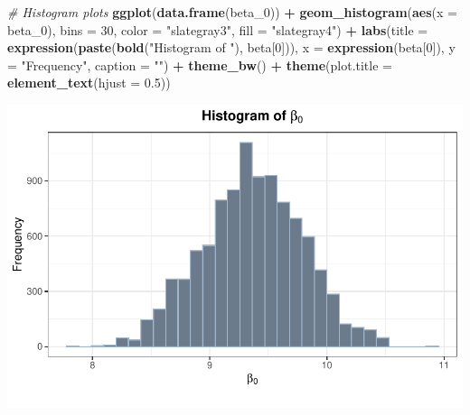 \documentclass[
]{article}
\newenvironment{Shaded}{\begin{snugshade}}{\end{snugshade}}
\newcommand{\AttributeTok}[1]{\textcolor[rgb]{0.13,0.29,0.53}{#1}}
\newcommand{\CommentTok}[1]{\textcolor[rgb]{0.56,0.35,0.01}{\textit{#1}}}
\newcommand{\DecValTok}[1]{\textcolor[rgb]{0.00,0.00,0.81}{#1}}
\newcommand{\FloatTok}[1]{\textcolor[rgb]{0.00,0.00,0.81}{#1}}
\newcommand{\FunctionTok}[1]{\textcolor[rgb]{0.13,0.29,0.53}{\textbf{#1}}}
\newcommand{\NormalTok}[1]{#1}
\newcommand{\SpecialCharTok}[1]{\textcolor[rgb]{0.81,0.36,0.00}{\textbf{#1}}}
\newcommand{\StringTok}[1]{\textcolor[rgb]{0.31,0.60,0.02}{#1}}
\begin{document}
\begin{Shaded}
\begin{Highlighting}[]
\CommentTok{\# Histogram plots}
\FunctionTok{ggplot}\NormalTok{(}\FunctionTok{data.frame}\NormalTok{(beta\_0)) }\SpecialCharTok{+}
  \FunctionTok{geom\_histogram}\NormalTok{(}\FunctionTok{aes}\NormalTok{(}\AttributeTok{x =}\NormalTok{ beta\_0), }\AttributeTok{bins =} \DecValTok{30}\NormalTok{, }\AttributeTok{color =} \StringTok{"slategray3"}\NormalTok{, }\AttributeTok{fill =} \StringTok{"slategray4"}\NormalTok{) }\SpecialCharTok{+}
  \FunctionTok{labs}\NormalTok{(}\AttributeTok{title =} \FunctionTok{expression}\NormalTok{(}\FunctionTok{paste}\NormalTok{(}\FunctionTok{bold}\NormalTok{(}\StringTok{"Histogram of "}\NormalTok{), beta[}\DecValTok{0}\NormalTok{])), }\AttributeTok{x =} \FunctionTok{expression}\NormalTok{(beta[}\DecValTok{0}\NormalTok{]), }\AttributeTok{y =} \StringTok{"Frequency"}\NormalTok{, }\AttributeTok{caption =} \StringTok{""}\NormalTok{) }\SpecialCharTok{+}
  \FunctionTok{theme\_bw}\NormalTok{() }\SpecialCharTok{+}
  \FunctionTok{theme}\NormalTok{(}\AttributeTok{plot.title =} \FunctionTok{element\_text}\NormalTok{(}\AttributeTok{hjust =} \FloatTok{0.5}\NormalTok{))}
\end{Highlighting}
\end{Shaded}

\includegraphics{Homework_6_files/figure-latex/prob4b-3.pdf}
\end{document}
